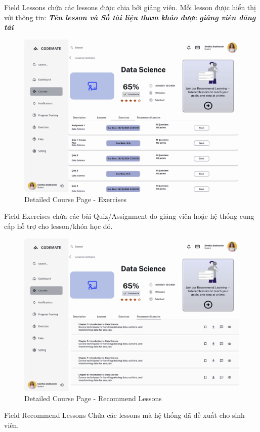 Field Lessons chứa các lessons được chia bởi giảng viên. Mỗi lesson được hiển thị với thông tin: \textbf{\textit{Tên lesson và Số tài liệu tham khảo được giảng viên đăng tải}}
\begin{figure}[H]
    \centering
    \includegraphics[width=0.7\linewidth]{Images/figmaDesign/Detailed Course Page - Exercises.png}
    \caption{Detailed Course Page - Exercises}
    \label{fig:enter-label}
\end{figure}
Field Exercises chứa các bài Quiz/Assignment do giảng viên hoặc hệ thống cung cấp hỗ trợ cho lesson/khóa học đó. 
\begin{figure}[H]
    \centering
    \includegraphics[width=0.7\linewidth]{Images/figmaDesign/Detailed Course Page - Recommend Lessons.png}
    \caption{Detailed Course Page - Recommend Lessons}
    \label{fig:enter-label}
\end{figure}
Field Recommend Lessons Chứa các lessons mà hệ thống đã đề xuất cho sinh viên. 
